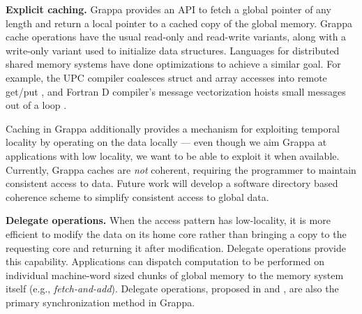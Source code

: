 \textbf{Explicit caching.} Grappa provides an API to fetch a global pointer of any length and return a local pointer to a cached copy of the global memory.  Grappa cache operations have the usual read-only and read-write variants, along with a write-only variant used to initialize data structures. Languages for distributed shared memory systems have done optimizations to achieve a similar goal. For example, the UPC compiler coalesces struct and array accesses into remote get/put \cite{Chen:2005}, and Fortran D compiler's message vectorization hoists small messages out of a loop \cite{FortranD:1992}. 

Caching in Grappa additionally provides a mechanism for exploiting temporal locality by operating on the data locally --- even though we aim Grappa at applications with low locality, we want to be able to exploit it when available. 
Currently, Grappa caches are \emph{not} coherent, requiring the programmer to maintain consistent access to data.  Future work will develop a software directory based coherence scheme to simplify consistent access to global data.

\textbf{Delegate operations.} When the access pattern has low-locality, it is more efficient to modify the data on its home core rather than bringing a copy to the requesting core and returning it after modification. Delegate operations provide this capability. Applications can dispatch computation to be performed on individual machine-word sized chunks of global memory to the memory system itself (e.g., \emph{fetch-and-add}).  Delegate operations, proposed in \cite{Nelson:hotpar11} and \cite{delegated:oopsla11}, are also the primary synchronization method in Grappa.


